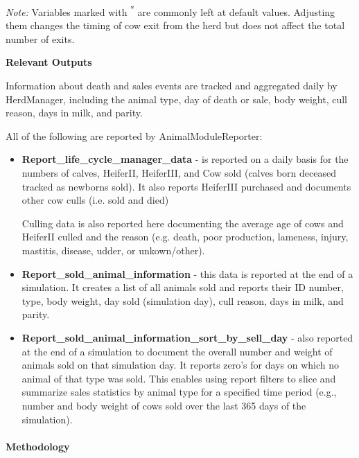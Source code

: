 \begin{refsection}
\begin{landscape}
{\footnotesize \textit{Note:} Variables marked with \textsuperscript{*} are commonly left at default values. Adjusting them changes the timing of cow exit from the herd but does not affect the total number of exits.}

\end{landscape}




\textbf{Relevant Outputs} 

Information about death and sales events are tracked and aggregated daily by HerdManager, including the animal type, day of death or sale, body weight, cull reason, days in milk, and parity. 
    
All of the following are reported by AnimalModuleReporter: 
\begin{itemize}
    \item \textbf{Report\_life\_cycle\_manager\_data} - is reported on a daily basis for the numbers of calves, HeiferII, HeiferIII, and Cow sold (calves born deceased tracked as newborns sold). It also reports HeiferIII purchased and documents other cow culls (i.e. sold and died)

    Culling data is also reported here documenting the average age of cows and HeiferII culled and the reason (e.g. death, poor production, lameness, injury, mastitis, disease, udder, or unkown/other).


    \item \textbf{Report\_sold\_animal\_information} - this data is reported at the end of a simulation. It creates a list of all animals sold and reports their ID number, type, body weight, day sold (simulation day), cull reason, days in milk, and parity. 

    \item \textbf{Report\_sold\_animal\_information\_sort\_by\_sell\_day} - also reported at the end of a simulation to document the overall number and weight of animals sold on that simulation day. It reports zero's for days on which no animal of that type was sold. This enables using report filters to slice and summarize sales statistics by animal type for a specified time period (e.g., number and body weight of cows sold over the last 365 days of the simulation).
\end{itemize}  

    
\paragraph{Methodology}
\vspace{0.2cm}



\end{refsection}
